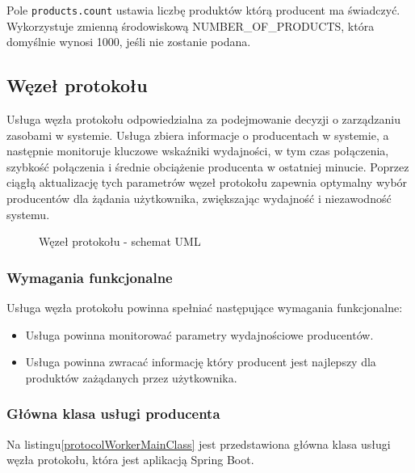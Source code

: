 Pole \verb|products.count| ustawia liczbę produktów którą producent ma świadczyć. Wykorzystuje zmienną środowiskową NUMBER\_OF\_PRODUCTS, która domyślnie wynosi 1000, jeśli nie zostanie podana.

\subsection{Węzeł protokołu}

Usługa węzła protokołu odpowiedzialna za podejmowanie decyzji o zarządzaniu zasobami w systemie. Usługa zbiera informacje o producentach w systemie, a następnie monitoruje kluczowe wskaźniki wydajności, w tym czas połączenia, szybkość połączenia i średnie obciążenie producenta w ostatniej minucie. Poprzez ciągłą aktualizację tych parametrów węzeł protokołu zapewnia optymalny wybór producentów dla żądania użytkownika, zwiększając wydajność i niezawodność systemu.

\begin{figure}[!htbp]
    \centering
    
    \caption{Węzeł protokołu - schemat UML}
    \label{ProducerUML}
\end{figure}

\subsubsection{Wymagania funkcjonalne}

Usługa węzła protokołu powinna spełniać następujące wymagania funkcjonalne:

\begin{itemize}
    \item Usługa powinna monitorować parametry wydajnościowe producentów.
    \item Usługa powinna zwracać informację który producent jest najlepszy dla produktów zażądanych przez użytkownika.
\end{itemize}

\subsubsection{Główna klasa usługi producenta}

Na listingu\ref{protocolWorkerMainClass} jest przedstawiona główna klasa usługi węzła protokołu, która jest aplikacją Spring Boot.


